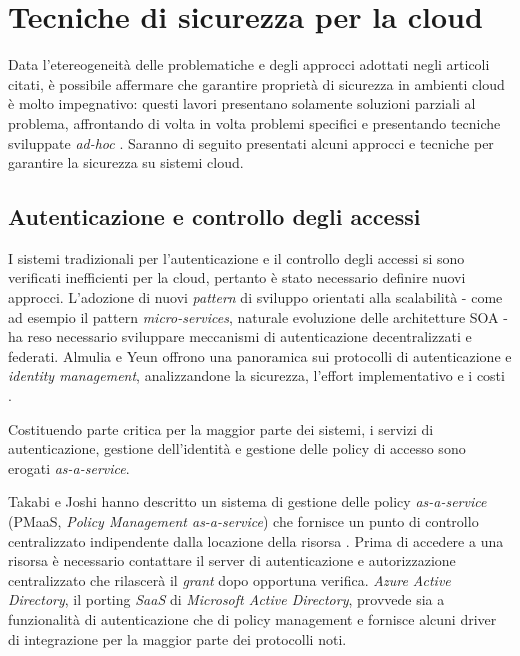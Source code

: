 \documentclass[../main.tex]{subfiles}
\begin{document}
\section{Tecniche di sicurezza per la cloud}
Data l'etereogeneità delle problematiche e degli approcci adottati negli articoli citati, è possibile affermare che garantire proprietà di sicurezza in ambienti cloud è molto impegnativo: questi lavori presentano solamente soluzioni parziali al problema, affrontando di volta in volta problemi specifici e presentando tecniche sviluppate \textit{ad-hoc} \cite{Ardagna:2015:SAC:2808687.2767005}.
Saranno di seguito presentati alcuni approcci e tecniche per garantire la sicurezza su sistemi cloud.

\subsection{Autenticazione e controllo degli accessi}
I sistemi tradizionali per l'autenticazione e il controllo degli accessi si sono verificati inefficienti per la cloud, pertanto è stato necessario definire nuovi approcci. L'adozione di nuovi \textit{pattern} di sviluppo orientati alla scalabilità - come ad esempio il pattern \textit{micro-services}, naturale evoluzione delle architetture SOA - ha reso necessario sviluppare meccanismi di autenticazione decentralizzati e federati.
Almulia e Yeun offrono una panoramica sui protocolli di autenticazione e \textit{identity management}, analizzandone la sicurezza, l'effort implementativo e i costi \cite{Ieee5542654}.

Costituendo parte critica per la maggior parte dei sistemi, i servizi di autenticazione, gestione dell'identità e gestione delle policy di accesso sono erogati \textit{as-a-service}.

Takabi e Joshi hanno descritto un sistema di gestione delle policy \textit{as-a-service} (PMaaS, \textit{Policy Management as-a-service}) che fornisce un punto di controllo centralizzato indipendente dalla locazione della risorsa \cite{pittir13526}.
Prima di accedere a una risorsa è necessario contattare il server di autenticazione e autorizzazione centralizzato che rilascerà il \textit{grant} dopo opportuna verifica.
\textit{Azure Active Directory}, il porting \textit{SaaS} di \textit{Microsoft Active Directory}, provvede sia a funzionalità di autenticazione che di policy management e fornisce alcuni driver di integrazione per la maggior parte dei protocolli noti.
\end{document}
